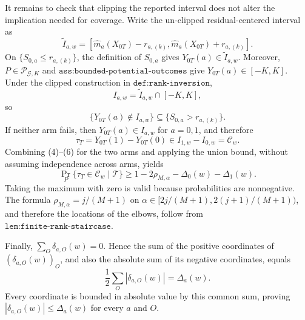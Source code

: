 It remains to check that clipping the reported interval does not alter the implication needed for coverage. Write the un-clipped residual-centered interval as
\[\widetilde I_{a,w}=[\widehat m_a(X_{0T})-r_{a,(k)},\widehat m_a(X_{0T})+r_{a,(k)}].\]
On \(\{S_{0,a}\le r_{a,(k)}\}\), the definition of \(S_{0,a}\) gives \(Y_{0T}(a)\in\widetilde I_{a,w}\). Moreover, \(P\in\mathcal P_{\mathcal G,K}\) and \(\texttt{ass:bounded-potential-outcomes}\) give \(Y_{0T}(a)\in[-K,K]\). Under the clipped construction in \(\texttt{def:rank-inversion}\),
\[I_{a,w}=\widetilde I_{a,w}\cap[-K,K],\]
so
\[\{Y_{0T}(a)\notin I_{a,w}\}\subseteq\{S_{0,a}>r_{a,(k)}\}.\tag{5}\]
If neither arm fails, then \(Y_{0T}(a)\in I_{a,w}\) for \(a=0,1\), and therefore
\[\tau_T=Y_{0T}(1)-Y_{0T}(0)\in I_{1,w}-I_{0,w}=\mathcal C_w.\tag{6}\]
Combining (4)--(6) for the two arms and applying the union bound, without assuming independence across arms, yields
\[\Pr_P\{\tau_T\in\mathcal C_w\mid\mathcal T\}\ge 1-2\rho_{M,\alpha}-\Delta_0(w)-\Delta_1(w).\]
Taking the maximum with zero is valid because probabilities are nonnegative. The formula \(\rho_{M,\alpha}=j/(M+1)\) on \(\alpha\in[2j/(M+1),2(j+1)/(M+1))\), and therefore the locations of the elbows, follow from \(\texttt{lem:finite-rank-staircase}\).

Finally, \(\sum_O\delta_{a,O}(w)=0\). Hence the sum of the positive coordinates of \((\delta_{a,O}(w))_O\), and also the absolute sum of its negative coordinates, equals
\[\frac12\sum_O|\delta_{a,O}(w)|=\Delta_a(w).\]
Every coordinate is bounded in absolute value by this common sum, proving \(|\delta_{a,O}(w)|\le\Delta_a(w)\) for every \(a\) and \(O\).